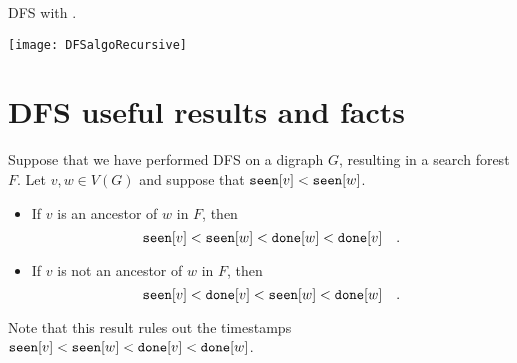 \begin{Boxample}
DFS with .
\begin{center}
\texttt{[image: DFSalgoRecursive]}
\end{center}
\end{Boxample}


\section{DFS useful results and facts}

%


\begin{Theorem}
\label{thm:DFS-seen-done}
Suppose that we have performed DFS on a digraph $G$, resulting in a 
search forest $F$. Let $v, w \in V(G)$ and suppose that $\seen[v] < \seen[w]$. 

\begin{itemize}
\item
If $v$ is an ancestor of $w$ in $F$, then 
$$\seen[v] < \seen[w] < \done[w] < \done[v] \quad .$$
\item
If $v$ is not an ancestor of $w$ in $F$, then
$$\seen[v] < \done[v]  < \seen[w] < \done[w] \quad .$$
\end{itemize}
\end{Theorem}

Note that this result rules out  the timestamps $\seen[v] < \seen[w] < \done[v] < \done[w]$.



